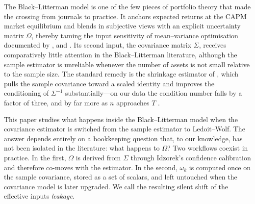 \documentclass[a4paper,11pt]{article}
\theoremstyle{plain}
\theoremstyle{definition}
\begin{document}
The Black--Litterman model \citep{BlackLitterman1992} is one of the few
pieces of portfolio theory that made the crossing from journals to
practice. It anchors expected returns at the CAPM market equilibrium
\citep{Sharpe1964} and blends in subjective views with an explicit
uncertainty matrix $\Omega$, thereby taming the input sensitivity of
mean--variance optimisation \citep{Markowitz1952} documented by
\citet{Michaud1989}, \citet{BestGrauer1991} and \citet{ChopraZiemba1993}.
Its second input, the covariance matrix $\Sigma$, receives comparatively
little attention in the Black--Litterman literature, although the sample
estimator is unreliable whenever the number of assets is not small
relative to the sample size. The standard remedy is the shrinkage
estimator of \citet{LedoitWolf2004}, which pulls the sample covariance
toward a scaled identity and improves the conditioning of $\Sigma^{-1}$
substantially---on our data the condition number falls by a factor of
three, and by far more as $n$ approaches $T$ \citep{LedoitWolfHoney2004}.

This paper studies what happens inside the Black--Litterman model when the
covariance estimator is switched from the sample estimator to Ledoit--Wolf.
The answer depends entirely on a bookkeeping question that, to our
knowledge, has not been isolated in the literature: what happens to
$\Omega$? Two workflows coexist in practice. In the first, $\Omega$ is
derived from $\Sigma$ through Idzorek's confidence calibration
\citep{Idzorek2007} and therefore co-moves with the estimator. In the
second, $\omega_k$ is computed once on the sample covariance, stored as a
set of scalars, and left untouched when the covariance model is later
upgraded. We call the resulting silent shift of the effective inputs
\emph{leakage}.
\end{document}
